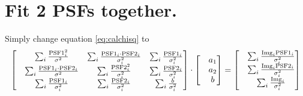 \documentclass[paper=letter, fontsize=11pt]{scrartcl} %
\numberwithin{equation}{section} %
\numberwithin{figure}{section} %
\numberwithin{table}{section} %
\begin{document}
\section{Fit 2 PSFs together.}
Simply change equation \ref{eq:calchisq} to
\newcommand{\PSFI}{\ensuremath{\mathrm{PSF1}}}
\newcommand{\PSFII}{\ensuremath{\mathrm{PSF2}}}
\begin{equation}
  \label{eq:1}  
  \begin{bmatrix}
    & \sum_{i} \frac{\PSFI_i^2}{\sigma^2}
    &\sum_{i}\frac{\PSFI_i\cdot\PSFII_i}{\sigma_i^2}
    &\sum_{i}\frac{\PSFI_i}{\sigma_i^{2}}\\
    & \sum_{i} \frac{\PSFI_i\cdot\PSFII_{i}}{\sigma^2}
    &\sum_{i}\frac{\PSFII_i^{2}}{\sigma_i^2}
    &\sum_{i}\frac{\PSFII_i}{\sigma_i^{2}} \\
    &\sum_{i}\frac{\PSFI_{i} }{\sigma_{i}^{2}}
    &\sum_{i}\frac{\PSFII_{i} }{\sigma_{i}^{2}}
    &\sum_{i}\frac{b}{\sigma_{i}^{2}}
  \end{bmatrix}
  \cdot
  \begin{bmatrix}
    &a_1\\
    &a_2\\
    & b
  \end{bmatrix}
  =
  \begin{bmatrix}
    &\sum_{i}\frac{\Img_i\PSFI_i}{\sigma_i^2}\\
    &\sum_i \frac{\Img_i\PSFII_i}{\sigma_i^2}\\
    &\sum_{i}\frac{\Img_{i}}{\sigma_{i}^{2}}
  \end{bmatrix}
\end{equation}
\end{document}
